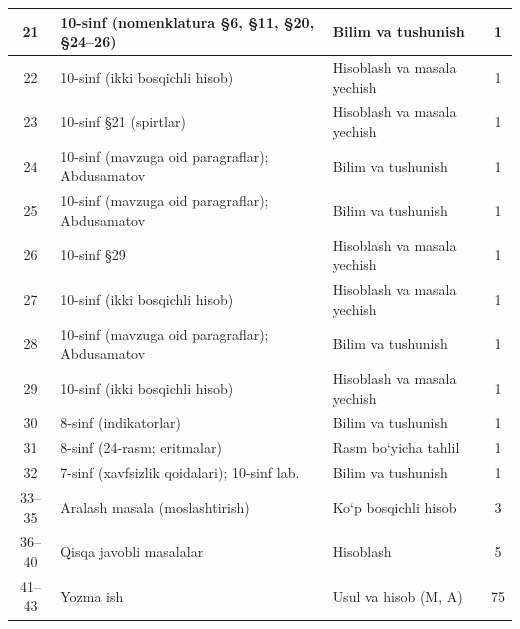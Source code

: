 \documentclass[11pt,a4paper]{article}
\begin{document}
{\begin{longtable}{|c|p{7.2cm}|p{5.4cm}|c|}
21 & 10-sinf (nomenklatura \S{}6, \S{}11, \S{}20, \S{}24--26) & Bilim va tushunish & 1\\\hline
22 & 10-sinf (ikki bosqichli hisob) & Hisoblash va masala yechish & 1\\\hline
23 & 10-sinf \S{}21 (spirtlar) & Hisoblash va masala yechish & 1\\\hline
24 & 10-sinf (mavzuga oid paragraflar); Abdusamatov & Bilim va tushunish & 1\\\hline
25 & 10-sinf (mavzuga oid paragraflar); Abdusamatov & Bilim va tushunish & 1\\\hline
26 & 10-sinf \S{}29 & Hisoblash va masala yechish & 1\\\hline
27 & 10-sinf (ikki bosqichli hisob) & Hisoblash va masala yechish & 1\\\hline
28 & 10-sinf (mavzuga oid paragraflar); Abdusamatov & Bilim va tushunish & 1\\\hline
29 & 10-sinf (ikki bosqichli hisob) & Hisoblash va masala yechish & 1\\\hline
30 & 8-sinf (indikatorlar) & Bilim va tushunish & 1\\\hline
31 & 8-sinf (24-rasm; eritmalar) & Rasm bo`yicha tahlil & 1\\\hline
32 & 7-sinf (xavfsizlik qoidalari); 10-sinf lab. & Bilim va tushunish & 1\\\hline
33--35 & Aralash masala (moslashtirish) & Ko`p bosqichli hisob & 3\\\hline
36--40 & Qisqa javobli masalalar & Hisoblash & 5\\\hline
41--43 & Yozma ish & Usul va hisob (M, A) & 75\\\hline
\end{longtable}}
\end{document}

